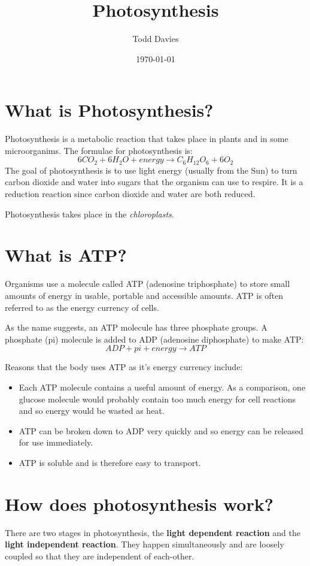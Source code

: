 \documentclass{article}
\title{Photosynthesis}
\author{Todd Davies}
\date{\today}
\begin{document}
\lhead{\today}

\maketitle

\section*{What is Photosynthesis?}
\thispagestyle{empty}
Photosynthesis is a metabolic reaction that takes place in plants and in some
microorganims. The formulae for photosynthesis is:
\[
	6CO_2 + 6H_2O + energy \rightarrow C_6H_{12}O_6 + 6O_2
\]
The goal of photosynthesis is to use light energy (usually from the Sun) to turn
carbon dioxide and water into sugars that the organism can use to respire. It is
a reduction reaction since carbon dioxide and water are both reduced.

Photosynthesis takes place in the \textit{chloroplasts}.
\section*{What is ATP?}
Organisms use a molecule called ATP (adenosine triphosphate) to store small
amounts of energy in usable, portable and accessible amounts. ATP is often
referred to as the energy currency of cells. 

As the name suggests, an ATP molecule has three phosphate groups. A phosphate
(pi) molecule is added to ADP (adenosine diphosphate) to make ATP:
\[
	ADP + pi + energy \rightarrow ATP
\]

Reasons that the body uses ATP as it's energy currency include:
\begin{itemize}
	
	\item Each ATP molecule contains a useful amount of energy. As a comparison,
	one glucose molecule would probably contain too much energy for cell
	reactions and so energy would be wasted as heat.

	\item ATP can be broken down to ADP very quickly and so energy can be
	released for use immediately.

	\item ATP is soluble and is therefore easy to transport.

\end{itemize}

\section*{How does photosynthesis work?}
There are two stages in photosynthesis, the \textbf{light dependent reaction}
and the \textbf{light independent reaction}. They happen simultaneously and are
loosely coupled so that they are independent of each-other.
\end{document}
